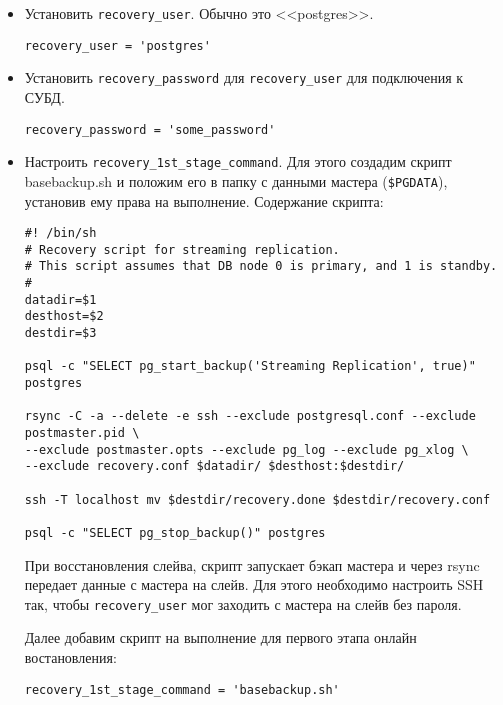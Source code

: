 \begin{itemize}

  \item Установить \lstinline!recovery_user!. Обычно это <<postgres>>.

\begin{lstlisting}[label=lst:pgpool42,caption=recovery\_user]
recovery_user = 'postgres'
\end{lstlisting}

  \item Установить \lstinline!recovery_password! для \lstinline!recovery_user! для подключения к СУБД.

\begin{lstlisting}[label=lst:pgpool43,caption=recovery\_password]
recovery_password = 'some_password'
\end{lstlisting}

  \item Настроить \lstinline!recovery_1st_stage_command!. Для этого создадим скрипт basebackup.sh и положим его в папку с данными мастера (\lstinline!$PGDATA!), установив ему права на выполнение. Содержание скрипта:

\begin{lstlisting}[label=lst:pgpool44,caption=basebackup.sh]
#! /bin/sh
# Recovery script for streaming replication.
# This script assumes that DB node 0 is primary, and 1 is standby.
#
datadir=$1
desthost=$2
destdir=$3

psql -c "SELECT pg_start_backup('Streaming Replication', true)" postgres

rsync -C -a --delete -e ssh --exclude postgresql.conf --exclude postmaster.pid \
--exclude postmaster.opts --exclude pg_log --exclude pg_xlog \
--exclude recovery.conf $datadir/ $desthost:$destdir/

ssh -T localhost mv $destdir/recovery.done $destdir/recovery.conf

psql -c "SELECT pg_stop_backup()" postgres
\end{lstlisting}

При восстановления слейва, скрипт запускает бэкап мастера и через rsync передает данные с мастера на слейв. Для этого необходимо настроить SSH так, чтобы \lstinline!recovery_user! мог заходить с мастера на слейв без пароля.

Далее добавим скрипт на выполнение для первого этапа онлайн востановления:

\begin{lstlisting}[label=lst:pgpool45,caption=recovery\_1st\_stage\_command]
recovery_1st_stage_command = 'basebackup.sh'
\end{lstlisting}


\end{itemize}
